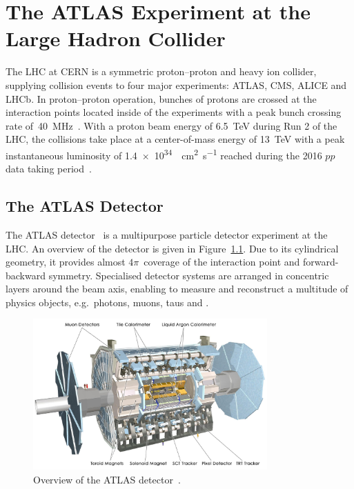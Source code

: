 \chapter{The ATLAS Experiment at the Large Hadron Collider}
\label{chap:atlas}

The LHC at CERN is a symmetric proton--proton and heavy ion collider, supplying
collision events to four major experiments: ATLAS, CMS, ALICE and LHCb. In
proton--proton operation, bunches of protons are crossed at the interaction
points located inside of the experiments with a peak bunch crossing rate
of~\SI{40}{\mega\hertz}~\cite{lhc}. With a proton beam energy of \SI{6.5}{\TeV}
during Run 2 of the LHC, the collisions take place at a center-of-mass energy of
\SI{13}{\TeV} with a peak instantaneous luminosity of
\SI{1.4e34}{\per\square\centi\metre\per\second} reached during the 2016 $pp$
data taking period~\cite{lhc_2016_report}.

\section{The ATLAS Detector}
\label{sec:atlas}

The ATLAS detector~\cite{atlas_detector} is a multipurpose particle detector
experiment at the LHC. An overview of the detector is given in
Figure~\ref{fig:atlas_detector}. Due to its cylindrical geometry, it provides
almost $4\pi$~coverage of the interaction point and forward-backward symmetry.
Specialised detector systems are arranged in concentric layers around the beam
axis, enabling to measure and reconstruct a multitude of physics objects, e.g.\
photons, muons, taus and .

\begin{figure}[htb]
  \centering
  \includegraphics[width=0.8\textwidth]{./figures/atlas/overview.jpg}
  \caption{Overview of the ATLAS detector~\cite{atlas_detector}.}
  \label{fig:atlas_detector}
\end{figure}


